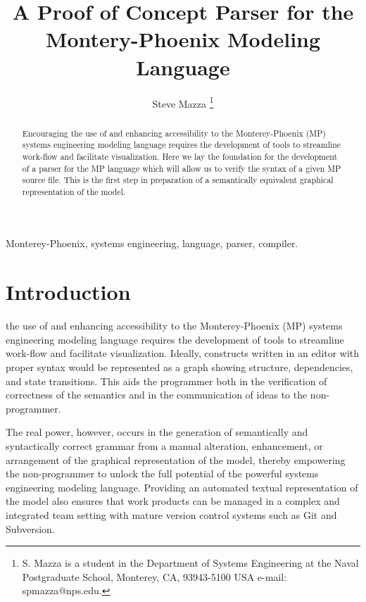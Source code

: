 \documentclass[journal]{IEEEtran}
\begin{document}
\title{A Proof of Concept Parser for the Montery-Phoenix Modeling Language}


\author{Steve Mazza%
\thanks{S. Mazza is a student in the Department of Systems Engineering at the 
Naval Postgraduate School, Monterey, CA, 93943-5100 USA 
e-mail: spmazza@nps.edu.}%
}


\maketitle


\begin{abstract}
Encouraging the use of and enhancing accessibility to the 
Monterey-Phoenix (MP) systems engineering modeling language requires the
development of tools to streamline work-flow and facilitate visualization.
Here we lay the foundation for the development of a parser for the
MP language which will allow us to verify the syntax of a given MP source file. 
This is the first step in preparation of a semantically equivalent graphical
representation of the model.
\end{abstract}


\begin{IEEEkeywords}
    Monterey-Phoenix, systems engineering, language, parser, compiler.
\end{IEEEkeywords}


\IEEEpeerreviewmaketitle


\section{Introduction}

 the use of and enhancing accessibility to the 
Monterey-Phoenix (MP) systems engineering modeling language requires the
development of tools to streamline work-flow and facilitate visualization. 
Ideally, constructs written in an editor with proper syntax would be 
represented as a graph showing structure, dependencies, and state transitions.
This aids the programmer both in the verification of correctness of the 
semantics and in the communication of ideas to the non-programmer.

The real power, however, occurs in the generation of semantically and syntactically
correct grammar from a manual alteration, enhancement, or arrangement of 
the graphical representation of the model, thereby empowering the non-programmer
to unlock the full potential of the powerful systems engineering modeling
language.  Providing an automated textual representation of the model also
ensures that work products can be managed in a complex and integrated team
setting with mature version control systems such as Git and Subversion.
\end{document}
